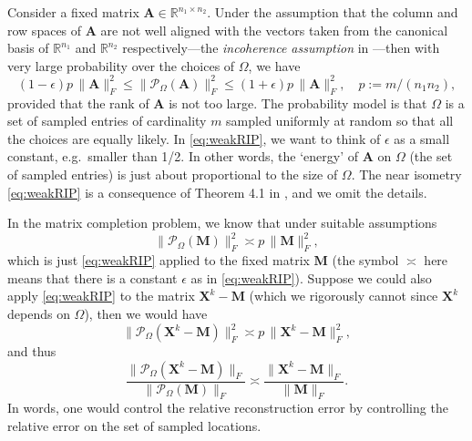 \documentclass[conference,onecolumn,12pt]{IEEEtran}
\newcommand{\R}{\mathbb{R}}
\newcommand{\mtx}[1]{\bm{#1}}
\numberwithin{equation}{section}
\numberwithin{figure}{section}
\numberwithin{table}{section}
\theoremstyle{definition}
\begin{document}
  Consider a fixed matrix $\mtx{A} \in \R^{n_1 \times n_2}$.  Under the
  assumption that the column and row spaces of $\mtx{A}$ are not well
  aligned with the vectors taken from the canonical basis of $\R^{n_1}$
  and $\R^{n_2}$ respectively---the {\em incoherence assumption} in
  \cite{candes2009exact}---then with very large probability over the choices
  of $\Omega$, we have
  \begin{equation}
    \label{eq:weakRIP}
    (1-\epsilon)  p \,  \|\mtx{A}\|_F^2  \le  \|\mathcal{P}_\Omega(\mtx{A})\|_F^2 \le   (1+\epsilon)  p \,  \|\mtx{A}\|_F^2, \quad p := m/(n_1n_2),
  \end{equation}
  provided that the rank of $\mtx{A}$ is not too large.  The probability
  model is that $\Omega$ is a set of sampled entries of cardinality $m$
  sampled uniformly at random so that all the choices are equally
  likely. In \eqref{eq:weakRIP}, we want to think of $\epsilon$ as a
  small constant, e.g.~smaller than 1/2. In other words, the `energy' of
  $\mtx{A}$ on $\Omega$ (the set of sampled entries) is just about
  proportional to the size of $\Omega$. The near isometry
  \eqref{eq:weakRIP} is a consequence of Theorem 4.1 in
  \cite{candes2009exact}, and we omit the details.
  
  In the matrix completion problem, we know that under suitable
  assumptions
  \[
  \|\mathcal{P}_\Omega(\mtx{M})\|_F^2 \asymp p \, \|\mtx{M}\|_F^2,
  \]
  which is just \eqref{eq:weakRIP} applied to the fixed matrix $\mtx{M}$
  (the symbol $\asymp$ here means that there is a constant $\epsilon$ as
  in \eqref{eq:weakRIP}). Suppose we could also apply \eqref{eq:weakRIP}
  to the matrix $\mtx{X}^k - \mtx{M}$ (which we rigorously cannot since
  $\mtx{X}^k$ depends on $\Omega$), then we would have
  \begin{equation}\label{eq:xk-m}
  \|\mathcal{P}_\Omega(\mtx{X}^k - \mtx{M})\|_F^2 \asymp p \,
  \|\mtx{X}^k - \mtx{M}\|_F^2,
  \end{equation}
  and thus
  \[
  \frac{\|\mathcal{P}_{\Omega}(\mtx{X}^k-\mtx{M})\|_F}{\|\mathcal{P}_{\Omega}(\mtx{M})\|_F}\asymp
  \frac{\|\mtx{X}^k - \mtx{M}\|_F}{\|\mtx{M}\|_F}.
  \]
  In words, one would control the relative reconstruction error by
  controlling the relative error on the set of sampled locations.
\end{document}
